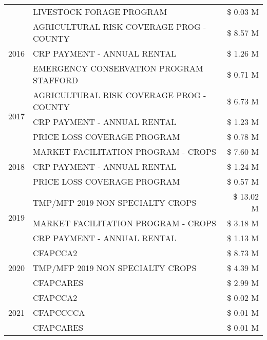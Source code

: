 \begin{tabular}{llr}
 & LIVESTOCK FORAGE PROGRAM & \$ 0.03 M \\
\cline{1-3}
\multirow[t]{3}{*}{2016} & AGRICULTURAL RISK COVERAGE PROG - COUNTY & \$ 8.57 M \\
 & CRP PAYMENT - ANNUAL RENTAL & \$ 1.26 M \\
 & EMERGENCY CONSERVATION PROGRAM STAFFORD & \$ 0.71 M \\
\cline{1-3}
\multirow[t]{3}{*}{2017} & AGRICULTURAL RISK COVERAGE PROG - COUNTY & \$ 6.73 M \\
 & CRP PAYMENT - ANNUAL RENTAL & \$ 1.23 M \\
 & PRICE LOSS COVERAGE PROGRAM & \$ 0.78 M \\
\cline{1-3}
\multirow[t]{3}{*}{2018} & MARKET FACILITATION PROGRAM - CROPS & \$ 7.60 M \\
 & CRP PAYMENT - ANNUAL RENTAL & \$ 1.24 M \\
 & PRICE LOSS COVERAGE PROGRAM & \$ 0.57 M \\
\cline{1-3}
\multirow[t]{3}{*}{2019} & TMP/MFP 2019 NON SPECIALTY CROPS & \$ 13.02 M \\
 & MARKET FACILITATION PROGRAM - CROPS & \$ 3.18 M \\
 & CRP PAYMENT - ANNUAL RENTAL & \$ 1.13 M \\
\cline{1-3}
\multirow[t]{3}{*}{2020} & CFAPCCA2 & \$ 8.73 M \\
 & TMP/MFP 2019 NON SPECIALTY CROPS & \$ 4.39 M \\
 & CFAPCARES & \$ 2.99 M \\
\cline{1-3}
\multirow[t]{3}{*}{2021} & CFAPCCA2 & \$ 0.02 M \\
 & CFAPCCCCA & \$ 0.01 M \\
 & CFAPCARES & \$ 0.01 M \\
\cline{1-3}
\bottomrule
\end{tabular}
